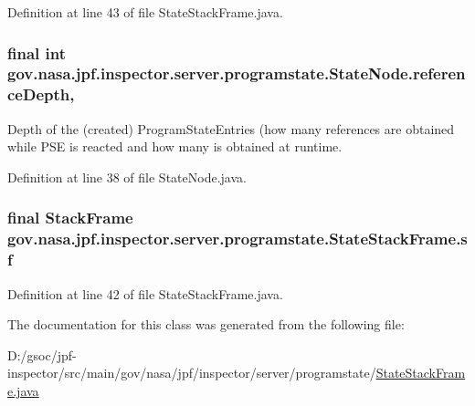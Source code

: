 Definition at line 43 of file State\+Stack\+Frame.\+java.

\subsubsection[{\texorpdfstring{reference\+Depth}{referenceDepth}}]{\setlength{\rightskip}{0pt plus 5cm}final int gov.\+nasa.\+jpf.\+inspector.\+server.\+programstate.\+State\+Node.\+reference\+Depth\hspace{0.3cm}{\ttfamily [protected]}, {\ttfamily [inherited]}}\hypertarget{classgov_1_1nasa_1_1jpf_1_1inspector_1_1server_1_1programstate_1_1_state_node_a55683618625dae46e8aa68d95811d6bb}{}\label{classgov_1_1nasa_1_1jpf_1_1inspector_1_1server_1_1programstate_1_1_state_node_a55683618625dae46e8aa68d95811d6bb}


Depth of the (created) Program\+State\+Entries (how many references are obtained while P\+SE is reacted and how many is obtained at runtime. 



Definition at line 38 of file State\+Node.\+java.

\subsubsection[{\texorpdfstring{sf}{sf}}]{\setlength{\rightskip}{0pt plus 5cm}final Stack\+Frame gov.\+nasa.\+jpf.\+inspector.\+server.\+programstate.\+State\+Stack\+Frame.\+sf\hspace{0.3cm}{\ttfamily [protected]}}\hypertarget{classgov_1_1nasa_1_1jpf_1_1inspector_1_1server_1_1programstate_1_1_state_stack_frame_a99c4d184fc27fa72ef791c58822af3f7}{}\label{classgov_1_1nasa_1_1jpf_1_1inspector_1_1server_1_1programstate_1_1_state_stack_frame_a99c4d184fc27fa72ef791c58822af3f7}


Definition at line 42 of file State\+Stack\+Frame.\+java.



The documentation for this class was generated from the following file\+:\begin{DoxyCompactItemize}
\item 
D\+:/gsoc/jpf-\/inspector/src/main/gov/nasa/jpf/inspector/server/programstate/\hyperlink{_state_stack_frame_8java}{State\+Stack\+Frame.\+java}\end{DoxyCompactItemize}
